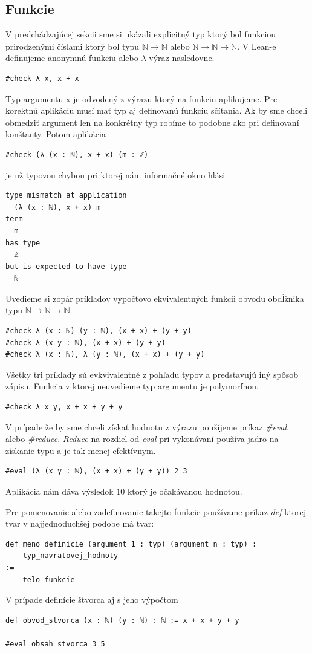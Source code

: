 \documentclass[a4paper,10pt,oneside]{report}%
\begin{document}
\subsection{Funkcie}
    V predchádzajúcej sekcii sme si ukázali explicitný typ ktorý bol funkciou prirodzenými
číslami ktorý bol typu $\mathbb{N} \to \mathbb{N}$ alebo $\mathbb{N} \to \mathbb{N} \to \mathbb{N}$.
V Lean-e definujeme anonymnú funkciu alebo $\lambda$-výraz nasledovne.
\begin{lstlisting}
#check λ x, x + x
\end{lstlisting}
    Typ argumentu x je odvodený z výrazu ktorý na funkciu aplikujeme.
    Pre korektnú aplikáciu musí mať typ aj definovanú funkciu sčítania.
    Ak by sme chceli obmedziť argument len na konkrétny typ robíme to podobne ako
pri definovaní konštanty. Potom aplikácia
\begin{lstlisting}
#check (λ (x : ℕ), x + x) (m : ℤ)
\end{lstlisting}
je už typovou chybou pri ktorej nám informačné okno hlási
\begin{lstlisting}
type mismatch at application
  (λ (x : ℕ), x + x) m
term
  m
has type
  ℤ
but is expected to have type
  ℕ
\end{lstlisting}
    Uvedieme si zopár príkladov vypočtovo ekvivalentných funkcii obvodu obdĺžnika typu
$\mathbb{N} \to \mathbb{N} \to \mathbb{N}$.
\begin{lstlisting}
#check λ (x : ℕ) (y : ℕ), (x + x) + (y + y)
#check λ (x y : ℕ), (x + x) + (y + y)
#check λ (x : ℕ), λ (y : ℕ), (x + x) + (y + y)
\end{lstlisting}
    Všetky tri príklady sú evkvivalentné z pohľadu typov a predstavujú iný spôsob
zápisu.
    Funkcia v ktorej neuvedieme typ argumentu je polymorfnou.
\begin{lstlisting}
#check λ x y, x + x + y + y
\end{lstlisting}

    V prípade že by sme chceli získať hodnotu z výrazu použíjeme príkaz \emph{\#eval},
alebo \emph{\#reduce}. \emph{Reduce} na rozdiel od \emph{eval} pri vykonávaní používa
jadro na získanie typu a je tak menej efektívnym.
\begin{lstlisting}
#eval (λ (x y : ℕ), (x + x) + (y + y)) 2 3
\end{lstlisting}
    Aplikácia nám dáva výsledok $10$ ktorý je očakávanou hodnotou.

    Pre pomenovanie alebo zadefinovanie takejto funkcie používame príkaz \emph{def}
ktorej tvar v najjednoduchšej podobe má tvar:
\begin{lstlisting}
def meno_definicie (argument_1 : typ) (argument_n : typ) :
    typ_navratovej_hodnoty 
:=
    telo funkcie
\end{lstlisting}
V prípade definície štvorca aj s jeho výpočtom
\begin{lstlisting}
def obvod_stvorca (x : ℕ) (y : ℕ) : ℕ := x + x + y + y

#eval obsah_stvorca 3 5
\end{lstlisting}
\end{document}
